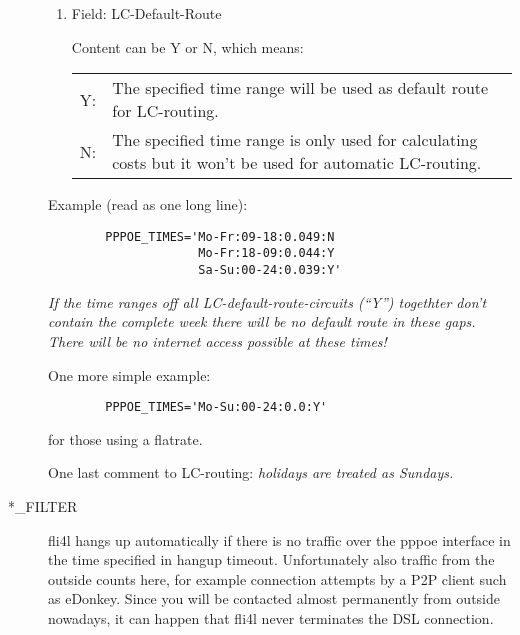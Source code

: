 \begin{description}
\begin{enumerate}
\item Field: LC-Default-Route
  
  Content can be Y or N, which means:

  \begin{tabular}[h!]{lp{11cm}}
    Y: & The specified time range will be used as default route
    for LC-routing.\\

    N: & The specified time range is only used for calculating
    costs but it won't be used for automatic LC-routing. \\
  \end{tabular}

\end{enumerate}

Example (read as one long line):

\begin{example}
\begin{verbatim}
        PPPOE_TIMES='Mo-Fr:09-18:0.049:N
                     Mo-Fr:18-09:0.044:Y
                     Sa-Su:00-24:0.039:Y'
\end{verbatim}
\end{example}


        \emph{If the time ranges off all LC-default-route-circuits
          (``Y'') togethter don't contain the complete week there 
          will be no default route in these gaps. There will be no
          internet access possible at these times!}


One more simple example:

\begin{example}
\begin{verbatim}
        PPPOE_TIMES='Mo-Su:00-24:0.0:Y'
\end{verbatim}
\end{example}

for those using a flatrate.

One last comment to LC-routing: \emph{holidays are
   treated as Sundays.}

\item[*\_FILTER]

fli4l hangs up automatically if there is no traffic over the pppoe 
interface in the time specified in hangup timeout. Unfortunately also 
traffic from the outside counts here, for example connection attempts 
by a P2P client such as eDonkey. Since you will be contacted almost 
permanently from outside nowadays, it can happen that fli4l never 
terminates the DSL connection.


\end{description}
